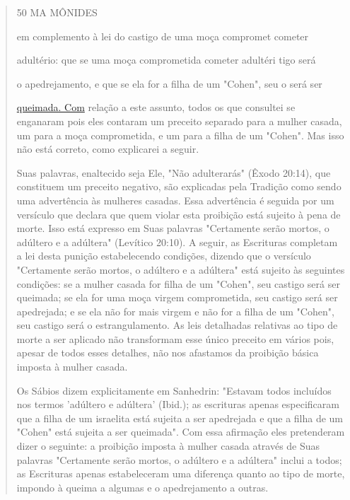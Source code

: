\begin{quote}
50 MA MÔNIDES

em complemento à lei do castigo de uma moça compromet cometer

adultério: que se uma moça comprometida cometer adultéri tigo será

o apedrejamento, e que se ela for a filha de um "Cohen", seu o será ser

\href{http://queimada.Com}{{queimada. Com}} relação a este assunto,
todos os que consultei se enganaram pois eles contaram um preceito
separado para a mulher casada, um para a moça comprometida, e um para a
filha de um "Cohen". Mas isso não está correto, como explicarei a
seguir.

Suas palavras, enaltecido seja Ele, "Não adulterarás" (Êxodo 20:14), que
constituem um preceito negativo, são explicadas pela Tradição como
sen­do uma advertência às mulheres casadas. Essa advertência é seguida
por um versículo que declara que quem violar esta proibição está sujeito
à pena de morte. Isso está expresso em Suas palavras "Certamente serão
mortos, o adúltero e a adúltera" (Levítico 20:10). A seguir, as
Escrituras completam a lei desta puni­ção estabelecendo condições,
dizendo que o versículo "Certamente serão mor­tos, o adúltero e a
adúltera" está sujeito às seguintes condições: se a mulher casada for
filha de um "Cohen", seu castigo será ser queimada; se ela for uma moça
virgem comprometida, seu castigo será ser apedrejada; e se ela não for
mais virgem e não for a filha de um "Cohen", seu castigo será o
estrangulamen­to. As leis detalhadas relativas ao tipo de morte a ser
aplicado não transformam esse único preceito em vários pois, apesar de
todos esses detalhes, não nos afas­tamos da proibição básica imposta à
mulher casada.

Os Sábios dizem explicitamente em Sanhedrin: "Estavam todos in­cluídos
nos termos 'adúltero e adúltera' (Ibid.); as escrituras apenas
especifica­ram que a filha de um israelita está sujeita a ser apedrejada
e que a filha de um "Cohen" está sujeita a ser queimada". Com essa
afirmação eles pretenderam dizer o seguinte: a proibição imposta à
mulher casada através de Suas palavras "Certamente serão mortos, o
adúltero e a adúltera" inclui a todos; as Escrituras apenas
estabeleceram uma diferença quanto ao tipo de morte, impondo à quei­ma a
algumas e o apedrejamento a outras.


\end{quote}
